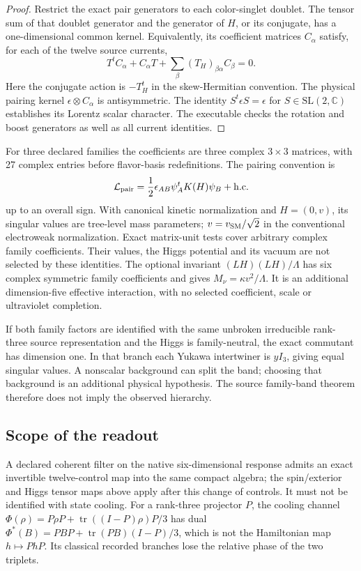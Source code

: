 \begin{proof}
Restrict the exact pair generators to each color-singlet doublet. The tensor
sum of that doublet generator and the generator of \(H\), or its conjugate,
has a one-dimensional common kernel. Equivalently, its coefficient matrices
\(C_\alpha\) satisfy, for each of the twelve source currents,
\[
 T^t C_\alpha+C_\alpha T+
 \sum_\beta(T_H)_{\beta\alpha}C_\beta=0.
\]
Here the conjugate action is \(-T_H^t\) in the skew-Hermitian convention.
The physical pairing kernel \(\epsilon\otimes C_\alpha\) is antisymmetric.
The identity \(S^t\epsilon S=\epsilon\) for \(S\in\mathrm{SL}(2,\mathbb C)\)
establishes its Lorentz scalar character. The executable checks the
rotation and boost generators as well as all current identities.
\end{proof}

For three declared families the coefficients are three complex
\(3\times3\) matrices, with 27 complex entries before flavor-basis
redefinitions. The pairing convention is
\[
 \mathcal L_{\rm pair}=\frac12\epsilon_{AB}
       \psi_A^tK(H)\psi_B+\mathrm{h.c.}
\]
up to an overall sign. With canonical kinetic normalization and
\(H=(0,v)\), its singular values are tree-level mass parameters;
\(v=v_{\rm SM}/\sqrt2\) in the conventional electroweak normalization.
Exact matrix-unit tests cover arbitrary complex family coefficients.
Their values, the Higgs potential and its vacuum are not selected by these
identities. The optional invariant \((LH)(LH)/\Lambda\) has six complex
symmetric family coefficients and gives \(M_\nu=\kappa v^2/\Lambda\).
It is an additional dimension-five effective interaction, with no selected
coefficient, scale or ultraviolet completion.

If both family factors are identified with the same unbroken irreducible
rank-three source representation and the Higgs is family-neutral, the exact
commutant has dimension one. In that branch each Yukawa intertwiner is
\(yI_3\), giving equal singular values. A nonscalar background can split the
band; choosing that background is an additional physical hypothesis. The
source family-band theorem therefore does not imply the observed hierarchy.

\subsection{Scope of the readout}

A declared coherent filter on the native six-dimensional response admits an
exact invertible twelve-control map into the same compact algebra; the
spin/exterior and Higgs tensor maps above apply after this change of controls.
It must not be identified with state cooling. For a rank-three projector
\(P\), the cooling channel
\(\Phi(\rho)=P\rho P+\operatorname{tr}((I-P)\rho)P/3\)
has dual \(\Phi^*(B)=PBP+\operatorname{tr}(PB)(I-P)/3\), which is not the
Hamiltonian map \(h\mapsto PhP\). Its classical recorded branches lose the
relative phase of the two triplets.

